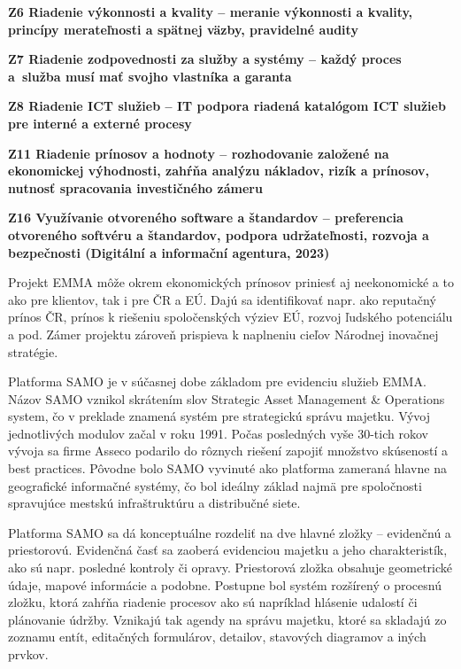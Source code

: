 \startitemize
\item \start\bf Z6 Riadenie výkonnosti a kvality \stop --  meranie výkonnosti a kvality, princípy merateľnosti a spätnej väzby, pravidelné audity
\item \start\bf Z7 Riadenie zodpovednosti za služby a systémy \stop -- každý proces a~služba musí mať svojho vlastníka a garanta
\item  \start\bf Z8 Riadenie ICT služieb \stop -- IT podpora riadená katalógom ICT služieb pre interné a externé procesy
\item \start\bf Z11 Riadenie prínosov a hodnoty \stop -- rozhodovanie založené na ekonomickej výhodnosti, zahŕňa analýzu nákladov, rizík a prínosov, nutnosť spracovania investičného zámeru
\item \start\bf Z16 Využívanie otvoreného software a štandardov \stop -- preferencia otvoreného softvéru a štandardov, podpora udržateľnosti, rozvoja a bezpečnosti  \scr(Digitální a informační agentura, 2023)
\stopitemize

Projekt EMMA môže okrem ekonomických prínosov priniesť aj neekonomické a to ako pre klientov, tak i pre ČR a EÚ. Dajú sa identifikovať napr. ako reputačný prínos ČR, prínos k riešeniu spoločenských výziev EÚ, rozvoj ľudského potenciálu a pod. Zámer projektu zároveň prispieva k naplneniu cieľov Národnej inovačnej stratégie.


Platforma SAMO je v súčasnej dobe základom pre evidenciu služieb EMMA. Názov SAMO vznikol skrátením slov Strategic Asset Management \& Operations system, čo v preklade znamená systém pre strategickú správu majetku. Vývoj jednotlivých modulov začal v roku 1991. Počas posledných vyše 30-tich rokov vývoja sa firme Asseco podarilo do rôznych riešení zapojiť množstvo skúseností a best practices. Pôvodne bolo SAMO vyvinuté ako platforma zameraná hlavne na geografické informačné systémy, čo bol ideálny základ najmä pre spoločnosti spravujúce mestskú infraštruktúru a distribučné siete.

Platforma SAMO sa dá konceptuálne rozdeliť na dve hlavné zložky – evidenčnú a priestorovú. Evidenčná časť sa zaoberá evidenciou majetku a jeho charakteristík, ako sú napr. posledné kontroly či opravy. Priestorová zložka obsahuje geometrické údaje, mapové informácie a podobne. Postupne bol systém rozšírený o procesnú zložku, ktorá zahŕňa riadenie procesov ako sú napríklad hlásenie udalostí či plánovanie údržby. Vznikajú tak agendy na správu majetku, ktoré sa skladajú zo zoznamu entít, editačných formulárov, detailov, stavových diagramov a iných prvkov. 

